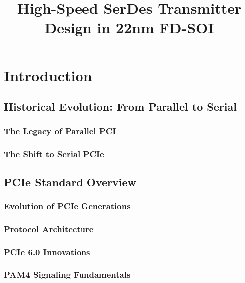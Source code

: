 \documentclass[12pt, a4paper]{report}
\begin{document}
\title{\textbf{High-Speed SerDes Transmitter Design in 22nm FD-SOI}}

\maketitle

\tableofcontents
\newpage

\chapter{Introduction}
\label{ch:intro}

\section{Historical Evolution: From Parallel to Serial}
    \subsection{The Legacy of Parallel PCI}
    \subsection{The Shift to Serial PCIe}
    
   
\section{PCIe Standard Overview}
    \subsection{Evolution of PCIe Generations}
    \subsection{Protocol Architecture}
    \subsection{PCIe 6.0 Innovations}
    \subsection{PAM4 Signaling Fundamentals}
\end{document}
